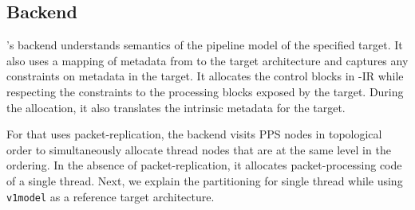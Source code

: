 \documentclass[letterpaper,twocolumn,10pt]{article}
\begin{document}






\subsection{\ucomp Backend}
\label{subsection:micro-backend}



\ucomp's backend understands semantics of the pipeline model of the
specified target. It also uses a mapping of metadata from \uarch to
the target architecture and captures any constraints on metadata in
the target. It allocates the control blocks in \uarch-IR while
respecting the constraints to the processing blocks exposed by the
target. During the allocation, it also translates the intrinsic
metadata for the target.


%
For \uprograms that uses packet-replication, the
backend visits PPS nodes in topological order to simultaneously
allocate thread nodes that are at the same level in the ordering. In
the absence of packet-replication, it allocates packet-processing code
of a single thread. Next, we explain the partitioning for single
thread while using \texttt{v1model} as a reference target architecture.
\end{document}
